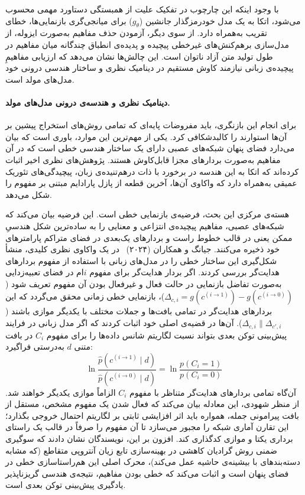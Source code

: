 با وجود اینکه این چارچوب در تفکیک علیت از همبستگی دستاورد مهمی محسوب می‌شود، اتکا به یک مدل خودرمزگذار جانشین ($g_\theta$) برای میانجی‌گری بازنمایی‌ها، خطای تقریب به‌همراه دارد. از سوی دیگر، آزمودن حذف مفاهیم به‌صورت ایزوله، از مدل‌سازی برهم‌کنش‌های غیرخطی پیچیده و پدیده‌ی انطباق چندگانه میان مفاهیم در طول تولید متن آزاد ناتوان است. این چالش‌ها نشان می‌دهد که ارزیابی مفاهیمِ پیچیده‌ی زبانی نیازمند کاوش مستقیم در دینامیک نظری و ساختار هندسی درونی خود مدل‌های مولد است.

\paragraph{دینامیک نظری و هندسه‌ی درونی مدل‌های مولد.}

برای انجام این بازنگری، باید مفروضات پایه‌ای که تمامی روش‌های استخراج پیشین بر آن‌ها استوارند را کالبدشکافی کرد. یکی از مهم‌ترین این موارد، باوری است که بیان می‌دارد فضای پنهان شبکه‌های عصبی دارای یک ساختار هندسی خطی است که در آن مفاهیم به‌صورت بردارهای مجزا قابل‌کاوش هستند. پژوهش‌های نظری اخیر اثبات کرده‌اند که اتکا به این هندسه در برخورد با ذات درهم‌تنیده‌ی زبان، پیچیدگی‌های تئوریک عمیقی به‌همراه دارد که واکاوی آن‌ها، آخرین قطعه از پازل پارادایم مبتنی بر مفهوم را شکل می‌دهد.

هسته‌ی مرکزی این بحث، فرضیه‌ی بازنمایی خطی است. این فرضیه بیان می‌کند که شبکه‌های عصبی، مفاهیم پیچیده‌ی انتزاعی و معنایی را به ساده‌ترین شکل هندسیِ ممکن یعنی در قالب خطوط راست و بردارهای یک‌بعدی در فضای متراکم پارامترهای خود ذخیره می‌کنند. جیانگ و همکاران (۲۰۲۴)~\cite{jiang2024origins} در یک واکاوی نظری کلیدی، منشأ شکل‌گیری این ساختار خطی را در مدل‌های زبانی با استفاده از مفهوم بردارهای هدایت‌گر بررسی کردند. اگر بردار هدایت‌گر برای مفهوم $i$ام در فضای تعبیه‌زدایی به‌صورت تفاضل بازنمایی در حالت فعال و غیرفعال بودن آن مفهوم تعریف شود ($\Delta_{c,i} = g(c^{(i \to 1)}) - g(c^{(i \to 0)})$)، بازنمایی خطی زمانی محقق می‌گردد که این بردارهای هدایت‌گر در تمامی بافت‌ها و جملات مختلف با یکدیگر موازی باشند ($\Delta_{c,i} \parallel \Delta_{c',i}$). آن‌ها در قضیه‌ی اصلی خود اثبات کردند که اگر مدل زبانی در فرایند پیش‌بینی توکن بعدی بتواند نسبت لگاریتم شانس داده‌ها را برای مفهوم $C_i$ در بافت متنی $d$ به‌درستی فراگیرد:
\begin{equation}\label{eq:chap3_linear_representation_hypothesis}
    \ln \frac{\hat{p}(c^{(i \to 1)} \mid d)}{\hat{p}(c^{(i \to 0)} \mid d)} = \ln \frac{p(C_i = 1)}{p(C_i = 0)}
\end{equation}
آن‌گاه تمامی بردارهای هدایت‌گر متناظر با مفهوم $C_i$ الزاماً موازی یکدیگر خواهند شد. از منظر شهودی، این معادله بیان می‌کند که فعال شدن یک مفهوم مشخص، مستقل از بافت پیرامونی جمله، همواره باید اثر افزایشی ثابتی بر لگاریتم احتمال خروجی بگذارد؛ این تقارن آماری شبکه را مجبور می‌سازد تا آن مفهوم را صرفاً در قالب یک راستای برداری یکتا و موازی کدگذاری کند. افزون بر این، نویسندگان نشان دادند که سوگیری ضمنی روش گرادیان کاهشی در بهینه‌سازی تابع زیان آنتروپی متقاطع (که مشابه دسته‌بندهای با بیشینه‌ی حاشیه عمل می‌کند)، محرک اصلی این هم‌راستاسازی خطی در فضای پنهان است و اثبات می‌کند که خطی بودن مفاهیم، نتیجه‌ی هندسی گریزناپذیر یادگیری پیش‌بینی توکن بعدی است.

